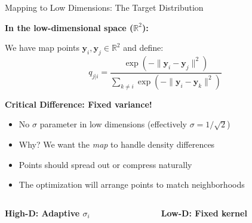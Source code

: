 \documentclass[10pt]{beamer}
\begin{document}
\begin{frame}{Mapping to Low Dimensions: The Target Distribution}

\textbf{In the low-dimensional space ($\mathbb{R}^2$):}

\vspace{0.15cm}
We have map points $\mathbf{y}_i, \mathbf{y}_j \in \mathbb{R}^2$ and define:
\begin{equation}
q_{j|i} = \frac{\exp\left(-\|\mathbf{y}_i - \mathbf{y}_j\|^2\right)}{\sum_{k \neq i} \exp\left(-\|\mathbf{y}_i - \mathbf{y}_k\|^2\right)}
\end{equation}

\vspace{0.15cm}
\textbf{Critical Difference: Fixed variance!}
\begin{itemize}
    \setlength\itemsep{0em}
    \item No $\sigma$ parameter in low dimensions (effectively $\sigma = 1/\sqrt{2}$)
    \item Why? We want the \emph{map} to handle density differences
    \item Points should spread out or compress naturally
    \item The optimization will arrange points to match neighborhoods
\end{itemize}

\vspace{0.15cm}
\begin{columns}
\begin{column}{0.5\textwidth}
\centering
\textbf{High-D: Adaptive $\sigma_i$}
\end{column}
\begin{column}{0.5\textwidth}
\centering
\textbf{Low-D: Fixed kernel}
\end{column}
\end{columns}
\end{frame}
\end{document}
